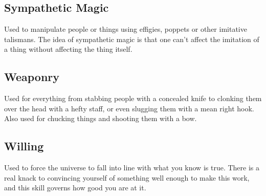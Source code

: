 \subsection{Sympathetic Magic}

Used to manipulate people or things using effigies, poppets or other imitative talismans.
The idea of sympathetic magic is that one can't affect the imitation of a thing without affecting the thing itself.

\subsection{Weaponry}

Used for everything from stabbing people with a concealed knife to clonking them over the head with a hefty staff, or even slugging them with a mean right hook.
Also used for chucking things and shooting them with a bow.

\subsection{Willing}

Used to force the universe to fall into line with what you know is true.
There is a real knack to convincing yourself of something well enough to make this work, and this skill governs how good you are at it.
